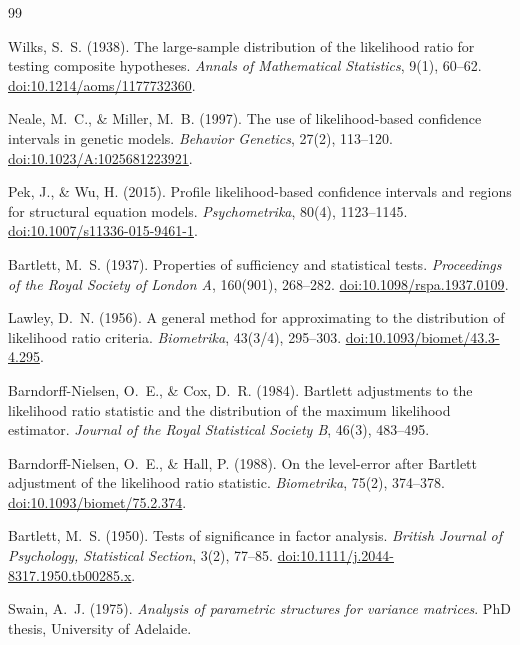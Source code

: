 \documentclass[11pt]{article}
\theoremstyle{plain}
\theoremstyle{remark}
\begin{document}
\begin{thebibliography}{99}

 Wilks, S.~S. (1938). The large-sample distribution of the
likelihood ratio for testing composite hypotheses. \emph{Annals of Mathematical
Statistics}, 9(1), 60--62.
\href{https://doi.org/10.1214/aoms/1177732360}{doi:10.1214/aoms/1177732360}.

 Neale, M.~C., \& Miller, M.~B. (1997). The use of
likelihood-based confidence intervals in genetic models. \emph{Behavior
Genetics}, 27(2), 113--120.
\href{https://doi.org/10.1023/A:1025681223921}{doi:10.1023/A:1025681223921}.

 Pek, J., \& Wu, H. (2015). Profile likelihood-based
confidence intervals and regions for structural equation models.
\emph{Psychometrika}, 80(4), 1123--1145.
\href{https://doi.org/10.1007/s11336-015-9461-1}{doi:10.1007/s11336-015-9461-1}.

 Bartlett, M.~S. (1937). Properties of sufficiency and
statistical tests. \emph{Proceedings of the Royal Society of London A}, 160(901),
268--282.
\href{https://doi.org/10.1098/rspa.1937.0109}{doi:10.1098/rspa.1937.0109}.

 Lawley, D.~N. (1956). A general method for approximating to
the distribution of likelihood ratio criteria. \emph{Biometrika}, 43(3/4),
295--303.
\href{https://doi.org/10.1093/biomet/43.3-4.295}{doi:10.1093/biomet/43.3-4.295}.

 Barndorff-Nielsen, O.~E., \& Cox, D.~R. (1984).
Bartlett adjustments to the likelihood ratio statistic and the distribution of the
maximum likelihood estimator. \emph{Journal of the Royal Statistical Society B},
46(3), 483--495.

 Barndorff-Nielsen, O.~E., \& Hall, P. (1988).
On the level-error after Bartlett adjustment of the likelihood ratio statistic.
\emph{Biometrika}, 75(2), 374--378.
\href{https://doi.org/10.1093/biomet/75.2.374}{doi:10.1093/biomet/75.2.374}.

 Bartlett, M.~S. (1950). Tests of significance in factor
analysis. \emph{British Journal of Psychology, Statistical Section}, 3(2),
77--85.
\href{https://doi.org/10.1111/j.2044-8317.1950.tb00285.x}{doi:10.1111/j.2044-8317.1950.tb00285.x}.

 Swain, A.~J. (1975). \emph{Analysis of parametric structures
for variance matrices}. PhD thesis, University of Adelaide.


\end{thebibliography}
\end{document}
